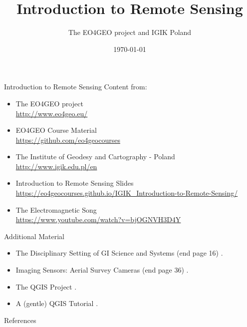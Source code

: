 \documentclass[aspectratio=169]{beamer}
\title[Class 02]{Introduction to Remote Sensing}
\author{The EO4GEO project and IGIK Poland}
\date{\today}
\begin{document}
\frame{\titlepage}


\begin{frame}{Introduction to Remote Sensing}
    Content from:
    \begin{itemize}
         \item The EO4GEO project \\ \href{http://www.eo4geo.eu/}{http://www.eo4geo.eu/}

         \item EO4GEO Course Material \\ \href{https://github.com/eo4geocourses}{https://github.com/eo4geocourses}

         \item The Institute of Geodesy and Cartography - Poland \\ \href{http://www.igik.edu.pl/en}{http://www.igik.edu.pl/en}

         \item Introduction to Remote Sensing Slides \\ \href{https://eo4geocourses.github.io/IGIK_Introduction-to-Remote-Sensing/}{https://eo4geocourses.github.io/IGIK\_Introduction-to-Remote-Sensing/}

         \item The Electromagnetic Song \\ \href{https://www.youtube.com/watch?v=bjOGNVH3D4Y}{https://www.youtube.com/watch?v=bjOGNVH3D4Y}
    \end{itemize}
\end{frame}

\begin{frame}{Additional Material}
    \begin{itemize}
        \item The Disciplinary Setting of GI Science and Systems (end page 16) \parencite{longley2015}.
        \item Imaging Sensors: Aerial Survey Cameras (end page 36) \parencite{lillesand_remote_2015}.
        \item The QGIS Project \parencite{graser_qgis_2025}.
        \item A (gentle) QGIS Tutorial \parencite{flenniken_quantum_2020}.

    \end{itemize}
\end{frame}

\begin{frame}[allowframebreaks]{References}
    \tiny
    \printbibliography
\end{frame}
\end{document}
